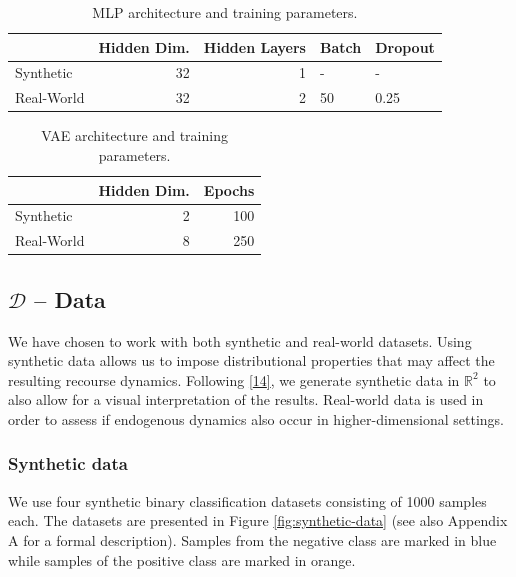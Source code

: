 \documentclass[conference,final,]{IEEEtran}
\begin{document}
\begin{table}

\caption{\label{tab:mlp}MLP architecture and training parameters.}
\centering
\begin{tabular}[t]{lrrll}
\toprule
  & Hidden Dim. & Hidden Layers & Batch & Dropout\\
\midrule
Synthetic & 32 & 1 & - & -\\
Real-World & 32 & 2 & 50 & 0.25\\
\bottomrule
\end{tabular}
\end{table}

\begin{table}

\caption{\label{tab:vae}VAE architecture and training parameters.}
\centering
\begin{tabular}[t]{lrr}
\toprule
  & Hidden Dim. & Epochs\\
\midrule
Synthetic & 2 & 100\\
Real-World & 8 & 250\\
\bottomrule
\end{tabular}
\end{table}

\hypertarget{empirical-data}{%
\subsection{\texorpdfstring{\(\mathcal{D}\) -- Data}{\textbackslash mathcal\{D\} -- Data}}\label{empirical-data}}

We have chosen to work with both synthetic and real-world datasets. Using synthetic data allows us to impose distributional properties that may affect the resulting recourse dynamics. Following \protect\hyperlink{ref-upadhyay2021towards}{{[}14{]}}, we generate synthetic data in \(\mathbb{R}^2\) to also allow for a visual interpretation of the results. Real-world data is used in order to assess if endogenous dynamics also occur in higher-dimensional settings.

\hypertarget{synthetic-data}{%
\subsubsection{Synthetic data}\label{synthetic-data}}

We use four synthetic binary classification datasets consisting of 1000 samples each. The datasets are presented in Figure \ref{fig:synthetic-data} (see also Appendix A for a formal description). Samples from the negative class are marked in blue while samples of the positive class are marked in orange.
\end{document}
